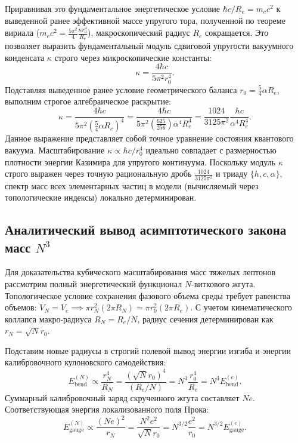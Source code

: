 \documentclass[11pt,a4paper]{article}
\begin{document}
	Приравнивая это фундаментальное энергетическое условие $\hbar c / R_e = m_e c^2$ к выведенной ранее эффективной массе упругого тора, полученной по теореме вириала ($m_e c^2 = \frac{5\pi^2}{4} \frac{\kappa r_0^4}{R_e}$), макроскопический радиус $R_e$ сокращается. Это позволяет выразить фундаментальный модуль сдвиговой упругости вакуумного конденсата $\kappa$ строго через микроскопические константы:
	\begin{equation}
		\kappa = \frac{4 \hbar c}{5\pi^2 r_0^4}.
	\end{equation}
	Подставляя выведенное ранее условие геометрического баланса $r_0 = \frac{5}{4}\alpha R_e$, выполним строгое алгебраическое раскрытие:
	\begin{equation}
		\kappa = \frac{4 \hbar c}{5\pi^2 \left( \frac{5}{4}\alpha R_e \right)^4} = \frac{4 \hbar c}{5\pi^2 \left( \frac{625}{256} \right) \alpha^4 R_e^4} = \frac{1024}{3125 \pi^2} \frac{\hbar c}{\alpha^4 R_e^4}.
	\end{equation}
	Данное выражение представляет собой точное уравнение состояния квантового вакуума. Масштабирование $\kappa \propto \hbar c / r_0^4$ идеально совпадает с размерностью плотности энергии Казимира для упругого континуума. 
	Поскольку модуль $\kappa$ строго выражен через точную рациональную дробь $\frac{1024}{3125\pi^2}$ и триаду $\{h, c, \alpha\}$, спектр масс всех элементарных частиц в модели (вычисляемый через топологические индексы) локально детерминирован.
	
	\subsection{Аналитический вывод асимптотического закона масс $N^3$}
	Для доказательства кубического масштабирования масс тяжелых лептонов рассмотрим полный энергетический функционал $N$-виткового жгута. Топологическое условие сохранения фазового объема среды требует равенства объемов: $V_N = V_e \implies \pi r_N^2 (2\pi R_N) = \pi r_0^2 (2\pi R_e)$. С учетом кинематического коллапса макро-радиуса $R_N = R_e / N$, радиус сечения детерминирован как $r_N = \sqrt{N} r_0$.
	
	Подставим новые радиусы в строгий полевой вывод энергии изгиба и энергии калибровочного кулоновского самодействия:
	\begin{equation}
		E_{\text{bend}}^{(N)} \propto \frac{r_N^4}{R_N} = \frac{(\sqrt{N} r_0)^4}{(R_e / N)} = N^3 \frac{r_0^4}{R_e} = N^3 E_{\text{bend}}^{(e)}.
	\end{equation}
	Суммарный калибровочный заряд скрученного жгута составляет $N e$. Соответствующая энергия локализованного поля Прока:
	\begin{equation}
		E_{\text{gauge}}^{(N)} \propto \frac{(Ne)^2}{r_N} = \frac{N^2 e^2}{\sqrt{N} r_0} = N^{3/2} \frac{e^2}{r_0} = N^{3/2} E_{\text{gauge}}^{(e)}.
	\end{equation}
	
\end{document}
